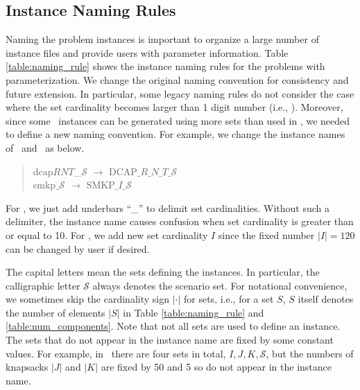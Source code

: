 \subsection{Instance Naming Rules}

Naming the problem instances is important to organize a large number of instance files and provide users with parameter information. Table \ref{table:naming_rule} shows the instance naming rules for the problems with parameterization. We change the original naming convention for consistency and future extension. In particular, some legacy naming rules do not consider the case where the set cardinality becomes larger than 1 digit number (i.e., {\dcap}). Moreover, since some \siplibtwo\ instances can be generated using more sets than used in \siplib, we needed to define a new naming convention. For example, we change the instance names of \dcap\ and \smkp\ as below.
\begin{quote}
	\centering dcap$RNT$\_$\mathcal{S}$ $\longrightarrow$ DCAP$\_R\_N\_T\_\mathcal{S}$\\
	smkp$\_\mathcal{S}$ $\longrightarrow$ SMKP$\_I\_\mathcal{S}$
\end{quote}
For \dcap, we just add underbars ``\_'' to delimit set cardinalities. Without such a delimiter, the instance name causes confusion when set cardinality is greater than or equal to 10. For \smkp, we add new set cardinality $I$ since the fixed number $|I|=120$ can be changed by user if desired.

The capital letters mean the sets defining the instances. In particular, the calligraphic letter $\mathcal{S}$ always denotes the scenario set. For notational convenience, we sometimes skip the cardinality sign $|\cdot|$ for sets, i.e., for a set $S$, $S$ itself denotes the number of elements $|S|$ in Table \ref{table:naming_rule} and \ref{table:num_components}. Note that not all sets are used to define an instance. The sets that do not appear in the instance name are fixed by some constant values. For example, in \smkp\ there are four sets in total, $I,J,K,\mathcal{S}$, but the numbers of knapsacks $|J|$ and $|K|$ are fixed by 50 and 5 so do not appear in the instance name.

